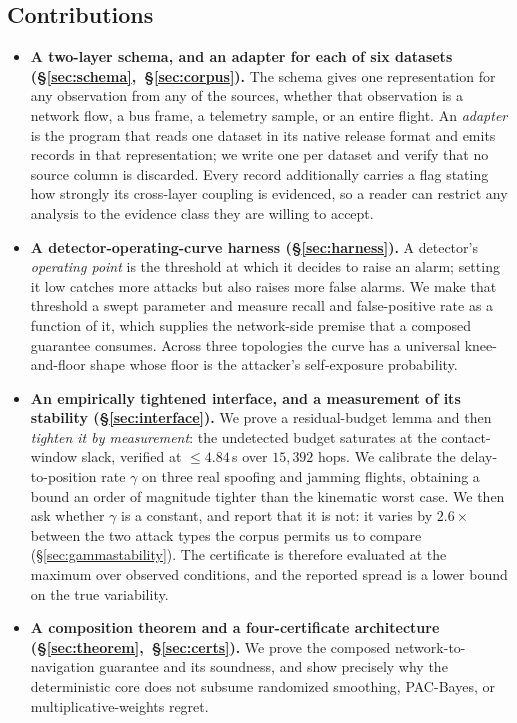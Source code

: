 \subsection*{Contributions}
\begin{itemize}
\item \textbf{A two-layer schema, and an adapter for each of six datasets
(\S\ref{sec:schema},~\S\ref{sec:corpus}).} The schema gives one representation
for any observation from any of the sources, whether that observation is a
network flow, a bus frame, a telemetry sample, or an entire flight. An
\emph{adapter} is the program that reads one dataset in its native release
format and emits records in that representation; we write one per dataset and
verify that no source column is discarded. Every record additionally carries a
flag stating how strongly its cross-layer coupling is evidenced, so a reader can
restrict any analysis to the evidence class they are willing to accept.

\item \textbf{A detector-operating-curve harness (\S\ref{sec:harness}).} A
detector's \emph{operating point} is the threshold at which it decides to raise
an alarm; setting it low catches more attacks but also raises more false alarms.
We make that threshold a swept parameter and measure recall and false-positive
rate as a function of it, which supplies the network-side premise that a
composed guarantee consumes. Across three topologies the curve has a universal
knee-and-floor shape whose floor is the attacker's self-exposure probability.

\item \textbf{An empirically tightened interface, and a measurement of its
stability (\S\ref{sec:interface}).} We prove a residual-budget lemma and then
\emph{tighten it by measurement}: the undetected budget saturates at the
contact-window slack, verified at $\le 4.84$\,s over $15{,}392$ hops. We
calibrate the delay-to-position rate $\gamma$ on three real spoofing and jamming
flights, obtaining a bound an order of magnitude tighter than the kinematic
worst case. We then ask whether $\gamma$ is a constant, and report that it is
not: it varies by $2.6\times$ between the two attack types the corpus permits us
to compare (\S\ref{sec:gammastability}). The certificate is therefore evaluated
at the maximum over observed conditions, and the reported spread is a lower
bound on the true variability.

\item \textbf{A composition theorem and a four-certificate architecture
(\S\ref{sec:theorem},~\S\ref{sec:certs}).} We prove the composed
network-to-navigation guarantee and its soundness, and show precisely why the
deterministic core does not subsume randomized smoothing, PAC-Bayes, or
multiplicative-weights regret.


\end{itemize}
